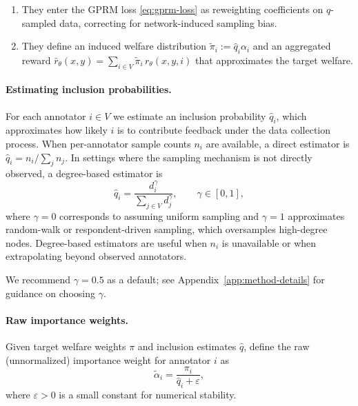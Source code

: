 \documentclass{article}
\theoremstyle{plain}
\theoremstyle{definition}
\theoremstyle{remark}
\begin{document}
\begin{enumerate}
    \item They enter the GPRM loss \eqref{eq:gprm-loss} as reweighting
    coefficients on $q$-sampled data, correcting for network-induced sampling
    bias.
    \item They define an induced welfare distribution
    $\tilde\pi_i := \hat q_i \alpha_i$ and an aggregated reward
    $\bar r_\theta(x,y) = \sum_{i \in V} \tilde\pi_i \, r_\theta(x,y,i)$ that
    approximates the target welfare.
\end{enumerate}

\paragraph{Estimating inclusion probabilities.}

For each annotator $i \in V$ we estimate an inclusion probability
$\hat q_i$, which approximates how likely $i$ is to contribute feedback under
the data collection process. When per-annotator sample counts $n_i$ are
available, a direct estimator is $\hat q_i = n_i / \sum_j n_j$. In settings
where the sampling mechanism is not directly observed, a degree-based
estimator is
\begin{equation}
    \hat q_i
    =
    \frac{d_i^\gamma}{\sum_{j \in V} d_j^\gamma},
    \qquad
    \gamma \in [0,1],
    \label{eq:qhat}
\end{equation}
where $\gamma = 0$ corresponds to assuming uniform sampling and
$\gamma = 1$ approximates random-walk or respondent-driven sampling, which
oversamples high-degree nodes. Degree-based estimators are useful when $n_i$
is unavailable or when extrapolating beyond observed annotators.

We recommend $\gamma = 0.5$ as a default; see Appendix~\ref{app:method-details} for guidance on choosing $\gamma$.

\paragraph{Raw importance weights.}

Given target welfare weights $\pi$ and inclusion estimates $\hat q$, define
the raw (unnormalized) importance weight for annotator $i$ as
\begin{equation}
    \tilde\alpha_i
    =
    \frac{\pi_i}{\hat q_i + \varepsilon},
    \label{eq:alpha-raw}
\end{equation}
where $\varepsilon > 0$ is a small constant for numerical stability.
\end{document}
